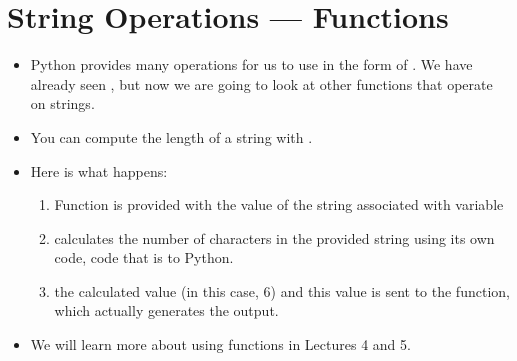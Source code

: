 \documentclass[letterpaper,10pt,english]{sphinxmanual}
\begin{document}
\section{String Operations — Functions}
\label{\detokenize{lecture_notes/lec03_strings:string-operations-functions}}\begin{itemize}
\item {} 
Python provides many operations for us to use in the form of
.  We have already seen , but now we
are going to look at other functions that operate on strings.

\item {} 
You can compute the length of a string with .

%
\begin{sphinxVerbatim}[commandchars=\\\{\}]
  
\end{sphinxVerbatim}

\item {} 
Here is what happens:
\begin{enumerate}
\item {} 
Function  is provided with the value of the string associated
with variable 

\item {} 
 calculates the number of characters in the provided
string using its own code, code that is  to Python.

\item {} 
  the calculated value (in this case, 6) and
this value is sent to the  function, which actually
generates the output.

\end{enumerate}

\item {} 
We will learn more about using functions in Lectures 4 and 5.

\end{itemize}
\end{document}
